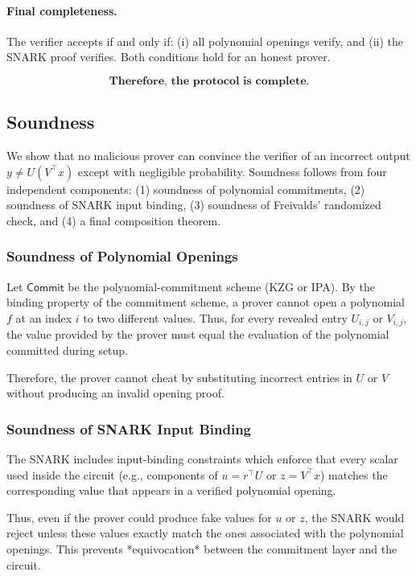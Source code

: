 \documentclass[11pt]{article}
\begin{document}
\paragraph{Final completeness.}
The verifier accepts if and only if:
(i) all polynomial openings verify, and
(ii) the SNARK proof verifies.
Both conditions hold for an honest prover.

\[
  \textbf{Therefore, the protocol is complete.}
\]


\subsection{Soundness}

We show that no malicious prover can convince the verifier of an
incorrect output $y \neq U(V^\top x)$ except with negligible
probability.  
Soundness follows from four independent components:
(1) soundness of polynomial commitments,  
(2) soundness of SNARK input binding,  
(3) soundness of Freivalds’ randomized check, and  
(4) a final composition theorem.

\subsubsection{Soundness of Polynomial Openings}

Let $\mathsf{Commit}$ be the polynomial-commitment scheme (KZG or IPA).
By the binding property of the commitment scheme, a prover cannot open a
polynomial $f$ at an index $i$ to two different values.  
Thus, for every revealed entry $U_{i,j}$ or $V_{i,j}$, the value
provided by the prover must equal the evaluation of the polynomial
committed during setup.

Therefore, the prover cannot cheat by substituting incorrect entries in
$U$ or $V$ without producing an invalid opening proof.

\subsubsection{Soundness of SNARK Input Binding}

The SNARK includes input-binding constraints which enforce that every
scalar used inside the circuit (e.g., components of $u = r^\top U$ or
$z = V^\top x$) matches the corresponding value that appears in a
verified polynomial opening.

Thus, even if the prover could produce fake values for $u$ or $z$, the
SNARK would reject unless these values exactly match the ones associated
with the polynomial openings.  
This prevents *equivocation* between the commitment layer and the circuit.
\end{document}
